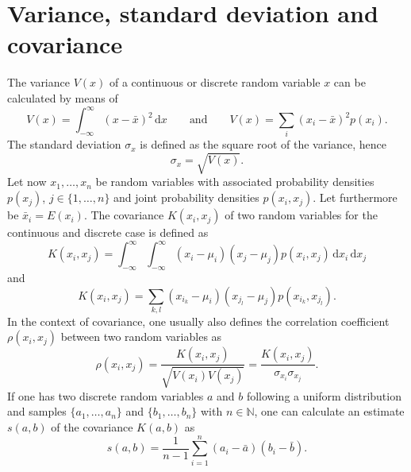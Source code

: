 \documentclass{report}
\numberwithin{tm}{section}
\begin{document}
\section{Variance, standard deviation and covariance}
The variance $V(x)$ of a continuous or discrete random variable $x$ can be calculated by means of \begin{equation}
	V(x) = \int_{-\infty}^{\infty} (x-\bar{x})^2\,\mathrm{d}x \qquad \text{and} \qquad V(x) = \sum_{i} (x_i-\bar{x})^2p(x_i).
\end{equation}
The standard deviation $\sigma_x$ is defined as the square root of the variance, hence \begin{equation}
	\sigma_x = \sqrt{V(x)}.
\end{equation}
Let now $x_1,\dots,x_n$ be random variables with associated probability densities $p(x_j)$, $j\in \{1,\dots,n\}$ and joint probability densities $p(x_i,x_j)$. Let furthermore be $\bar{x}_i = E(x_i)$. The covariance $K(x_i,x_j)$ of two random variables for the continuous and discrete case is defined as \begin{equation}\label{eq:covariance}
	K(x_i,x_j) = \int_{-\infty}^{\infty}\int_{-\infty}^{\infty}(x_i-\mu_i)(x_j-\mu_j)p(x_i,x_j)\,\mathrm{d}x_i\,\mathrm{d}x_j
\end{equation} and \begin{equation}
K(x_i,x_j) = \sum_{k,l}(x_{i_k}-\mu_{i})(x_{j_l}-\mu_j)p(x_{i_k},x_{j_l}).
\end{equation} In the context of covariance, one usually also defines the correlation coefficient $\rho(x_i,x_j)$ between two random variables as \begin{equation}\label{eq:correlationcoefficient}
\rho(x_i,x_j) = \frac{K(x_i,x_j)}{\sqrt{V(x_i)V(x_j)}} = \frac{K(x_i,x_j)}{\sigma_{x_i}\sigma_{x_j}}.
\end{equation} If one has two discrete random variables $a$ and $b$ following a uniform distribution and samples $\{a_1,\dots,a_n\}$ and $\{b_1,\dots,b_n\}$ with $n\in \mathbb{N}$, one can calculate an estimate $s(a,b)$ of the covariance $K(a,b)$ as \begin{equation}
s(a,b) = \frac{1}{n-1}\sum_{i=1}^{n} (a_i-\bar{a})(b_i-\bar{b}).
\end{equation}
\end{document}
